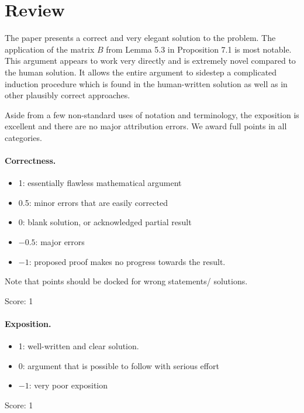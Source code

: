 \documentclass[11pt]{article}
\theoremstyle{definition}
\theoremstyle{remark}
\begin{document}
\maketitle

\section{Review}
The paper presents a correct and very elegant solution to the problem. The application of the matrix $B$ from Lemma 5.3 in Proposition 7.1 is most notable. This argument appears to work very directly and is extremely novel compared to the human solution. It allows the entire argument to sidestep a complicated induction procedure which is found in the human-written solution as well as in other plausibly correct approaches.

Aside from a few non-standard uses of notation and terminology, the exposition is excellent and there are no major attribution errors. We award full points in all categories.

\paragraph{Correctness.}
\begin{itemize}
	\item  1: essentially flawless mathematical argument
	\item  0.5: minor errors that are easily corrected
	\item  0: blank solution, or acknowledged partial result
	\item  $-0.5$: major errors
	\item  $-1$: proposed proof makes no progress towards the result.
\end{itemize}
Note that points should be docked for wrong statements/ solutions.

\noindent Score: 1

\paragraph{Exposition.}
\begin{itemize}
	\item  1: well-written and clear solution.
	\item  0: argument that is possible to follow with serious effort
	\item  $-1$: very poor exposition
\end{itemize}

\noindent Score: 1
\end{document}
